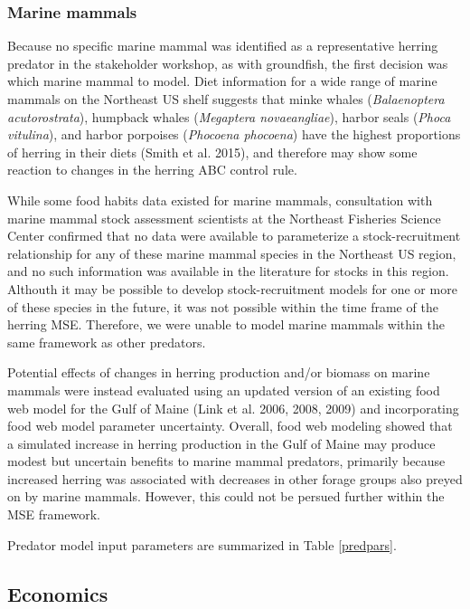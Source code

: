 \documentclass[]{article}
\begin{document}
\subsubsection{Marine mammals}\label{marine-mammals}

Because no specific marine mammal was identified as a representative
herring predator in the stakeholder workshop, as with groundfish, the
first decision was which marine mammal to model. Diet information for a
wide range of marine mammals on the Northeast US shelf suggests that
minke whales (\emph{Balaenoptera acutorostrata}), humpback whales
(\emph{Megaptera novaeangliae}), harbor seals (\emph{Phoca vitulina}),
and harbor porpoises (\emph{Phocoena phocoena}) have the highest
proportions of herring in their diets (Smith et al. 2015), and therefore
may show some reaction to changes in the herring ABC control rule.

While some food habits data existed for marine mammals, consultation
with marine mammal stock assessment scientists at the Northeast
Fisheries Science Center confirmed that no data were available to
parameterize a stock-recruitment relationship for any of these marine
mammal species in the Northeast US region, and no such information was
available in the literature for stocks in this region. Althouth it may
be possible to develop stock-recruitment models for one or more of these
species in the future, it was not possible within the time frame of the
herring MSE. Therefore, we were unable to model marine mammals within
the same framework as other predators.

Potential effects of changes in herring production and/or biomass on
marine mammals were instead evaluated using an updated version of an
existing food web model for the Gulf of Maine (Link et al. 2006, 2008,
2009) and incorporating food web model parameter uncertainty. Overall,
food web modeling showed that a simulated increase in herring production
in the Gulf of Maine may produce modest but uncertain benefits to marine
mammal predators, primarily because increased herring was associated
with decreases in other forage groups also preyed on by marine mammals.
However, this could not be persued further within the MSE framework.

Predator model input parameters are summarized in Table \ref{predpars}.

\subsection{Economics}\label{economics}
\end{document}
